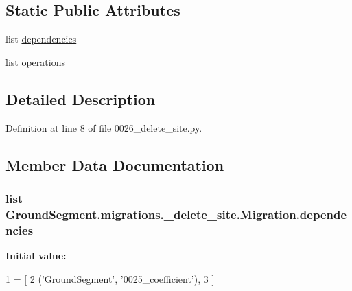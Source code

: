 \subsection*{Static Public Attributes}
\begin{DoxyCompactItemize}
\item 
list \hyperlink{class_ground_segment_1_1migrations_1_10026__delete__site_1_1_migration_a3460d1952c348c85a1722e0b52f0cf3a}{dependencies}
\item 
list \hyperlink{class_ground_segment_1_1migrations_1_10026__delete__site_1_1_migration_a01b8f880d65e82337e5c982f032582f2}{operations}
\end{DoxyCompactItemize}


\subsection{Detailed Description}


Definition at line 8 of file 0026\+\_\+delete\+\_\+site.\+py.



\subsection{Member Data Documentation}
\hypertarget{class_ground_segment_1_1migrations_1_10026__delete__site_1_1_migration_a3460d1952c348c85a1722e0b52f0cf3a}{}
\subsubsection[{dependencies}]{\setlength{\rightskip}{0pt plus 5cm}list Ground\+Segment.\+migrations.\+\_\+delete\+\_\+site.\+Migration.\+dependencies\hspace{0.3cm}{\ttfamily [static]}}\label{class_ground_segment_1_1migrations_1_10026__delete__site_1_1_migration_a3460d1952c348c85a1722e0b52f0cf3a}
{\bfseries Initial value\+:}
\begin{DoxyCode}
1 = [
2         (\textcolor{stringliteral}{'GroundSegment'}, \textcolor{stringliteral}{'0025\_coefficient'}),
3     ]
\end{DoxyCode}


